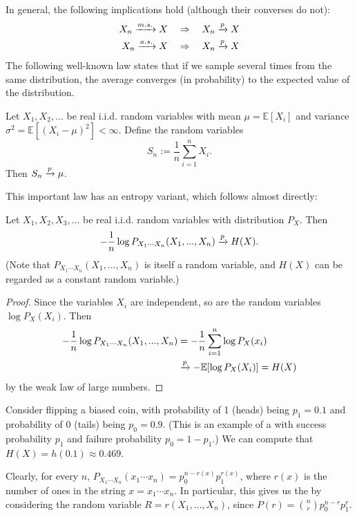 In general, the following implications hold (although their converses do not):
\begin{align}
X_n \xrightarrow{m.s.} X \ \ \ &\Rightarrow\ \ \  X_n \xrightarrow{p} X\\
X_n \xrightarrow{a.s.} X \ \ \ &\Rightarrow\ \ \  X_n \xrightarrow{p} X
\end{align}
The following well-known law states that if we sample several times from the same distribution, the average converges (in probability) to the expected value of the distribution.
\begin{theorem}
Let $X_1, X_2, ...$ be real i.i.d. random variables with mean $\mu = \mathbb{E}[X_i]$ and variance $\sigma^2 = \mathbb{E}[(X_i - \mu)^2] < \infty$. Define the random variables
\[
S_n := \frac{1}{n} \sum_{i=1}^n X_i.
\]
Then $S_n \xrightarrow{p} \mu$.
\end{theorem}
This important law has an entropy variant, which follows almost directly:
\begin{theorem}
Let $X_1, X_2, X_3, ...$ be real i.i.d. random variables with distribution $P_X$. Then
\[
-\frac{1}{n} \log P_{X_1 \cdots X_n}(X_1, ..., X_n) \xrightarrow{p} H(X).
\]
(Note that $P_{X_1 \cdots X_n}(X_1, ..., X_n)$ is itself a random variable, and $H(X)$ can be regarded as a constant random variable.)
\end{theorem}
\begin{proof}
Since the variables $X_i$ are independent, so are the random variables $\log P_X(X_i)$. Then
\begin{align}
-\frac{1}{n} \log P_{X_1\cdots X_n}(X_1, ..., X_n) &= -\frac{1}{n} \sum_{i=1}^n \log P_X(x_i)\nonumber\\
&\xrightarrow{p} - \mathbb{E}[\log P_X(X_i)] = H(X)
\end{align}
by the weak law of large numbers.
\end{proof}

\begin{example}
Consider flipping a biased coin, with probability of 1 (heads) being $p_1 = 0.1$ and probability of 0 (tails) being $p_0 = 0.9$. (This is an example of a  with success probability $p_1$ and failure probability $p_0 = 1 - p_1$.) We can compute that $H(X) = h(0.1) \approx 0.469$.

Clearly, for every $n$, $P_{X_1 \cdots X_n}(x_1\cdots x_n) = p_0^{n-r(x)}p_1^{r(x)}$, where $r(x)$ is the number of ones in the string $x = x_1\cdots x_n$. In particular, this gives us the  by considering the random variable $R = r(X_1, ..., X_n)$, since $P(r) = \binom{n}{r} p_0^{n-r} p_1^r$.
\end{example}

